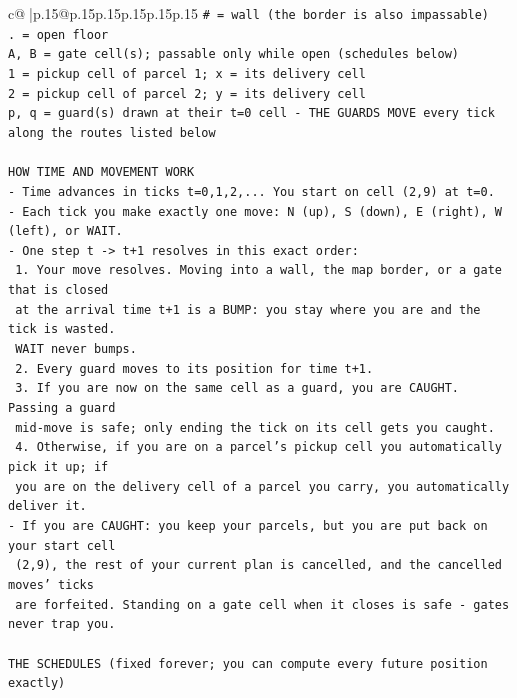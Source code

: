 \documentclass{article}
\begin{document}
{\begin{supertabular}{c@{$\;$}|p{.15\linewidth}@{}p{.15\linewidth}p{.15\linewidth}p{.15\linewidth}p{.15\linewidth}p{.15\linewidth}}
{{{\texttt{\# = wall (the border is also impassable)} \\
\texttt{. = open floor} \\
\texttt{A, B = gate cell(s); passable only while open (schedules below)} \\
\texttt{1 = pickup cell of parcel 1; x = its delivery cell} \\
\texttt{2 = pickup cell of parcel 2; y = its delivery cell} \\
\texttt{p, q = guard(s) drawn at their t=0 cell {-} THE GUARDS MOVE every tick along the routes listed below} \\
\\ 
\texttt{HOW TIME AND MOVEMENT WORK} \\
\texttt{{-} Time advances in ticks t=0,1,2,... You start on cell (2,9) at t=0.} \\
\texttt{{-} Each tick you make exactly one move: N (up), S (down), E (right), W (left), or WAIT.} \\
\texttt{{-} One step t {-}> t+1 resolves in this exact order:} \\
\texttt{  1. Your move resolves. Moving into a wall, the map border, or a gate that is closed} \\
\texttt{     at the arrival time t+1 is a BUMP: you stay where you are and the tick is wasted.} \\
\texttt{     WAIT never bumps.} \\
\texttt{  2. Every guard moves to its position for time t+1.} \\
\texttt{  3. If you are now on the same cell as a guard, you are CAUGHT. Passing a guard} \\
\texttt{     mid{-}move is safe; only ending the tick on its cell gets you caught.} \\
\texttt{  4. Otherwise, if you are on a parcel's pickup cell you automatically pick it up; if} \\
\texttt{     you are on the delivery cell of a parcel you carry, you automatically deliver it.} \\
\texttt{{-} If you are CAUGHT: you keep your parcels, but you are put back on your start cell} \\
\texttt{  (2,9), the rest of your current plan is cancelled, and the cancelled moves' ticks} \\
\texttt{  are forfeited. Standing on a gate cell when it closes is safe {-} gates never trap you.} \\
\\ 
\texttt{THE SCHEDULES (fixed forever; you can compute every future position exactly)} \\
}}}
\end{supertabular}}
\end{document}
